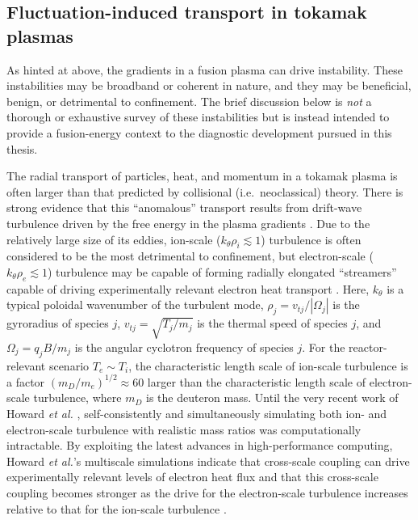 \subsection{Fluctuation-induced transport in tokamak plasmas}
As hinted at above, the gradients in a fusion plasma can drive instability.
These instabilities may be broadband or coherent in nature, and
they may be beneficial, benign, or detrimental to confinement.
The brief discussion below is \emph{not}
a thorough or exhaustive survey of these instabilities but
is instead intended to provide a fusion-energy context
to the diagnostic development pursued in this thesis.

The radial transport of particles, heat, and momentum in a tokamak plasma is
often larger than that predicted by collisional (i.e.\ neoclassical) theory.
There is strong evidence that this ``anomalous'' transport
results from drift-wave turbulence
driven by the free energy in the plasma gradients
\cite{horton_drift_waves,tynan_ppcf09}.
Due to the relatively large size of its eddies,
ion-scale ($k_{\theta} \rho_i \lesssim 1$) turbulence is often considered
to be the most detrimental to confinement, but
electron-scale ($k_{\theta} \rho_e \lesssim 1$) turbulence
may be capable of forming radially elongated ``streamers''
\cite{dorland_prl00}
capable of driving experimentally relevant electron heat transport
\cite{jenko_prl02}.
Here, $k_{\theta}$ is a typical poloidal wavenumber of the turbulent mode,
$\rho_j = v_{tj} / |\Omega_j|$ is the gyroradius of species $j$,
$v_{tj} = \sqrt{T_j / m_j}$ is the thermal speed of species $j$, and
$\Omega_j = q_j B / m_j$ is the angular cyclotron frequency of species $j$.
For the reactor-relevant scenario $T_e \sim T_i$,
the characteristic length scale of ion-scale turbulence is a factor
$(m_D / m_e)^{1/2} \approx 60$ larger than
the characteristic length scale of electron-scale turbulence,
where $m_D$ is the deuteron mass.
Until the very recent work of Howard \emph{et al.}
\cite{howard_pp14, howard_nf16, howard_pp16, holland_nf17, howard_ppcf18},
self-consistently and simultaneously simulating
both ion- and electron-scale turbulence with realistic mass ratios
was computationally intractable.
By exploiting the latest advances in high-performance computing,
Howard \emph{et al.}'s multiscale simulations indicate
that cross-scale coupling can drive
experimentally relevant levels of electron heat flux
\cite{howard_pp14, howard_ppcf18} and
that this cross-scale coupling becomes stronger
as the drive for the electron-scale turbulence increases
relative to that for the ion-scale turbulence
\cite{howard_nf16, howard_pp16}.

